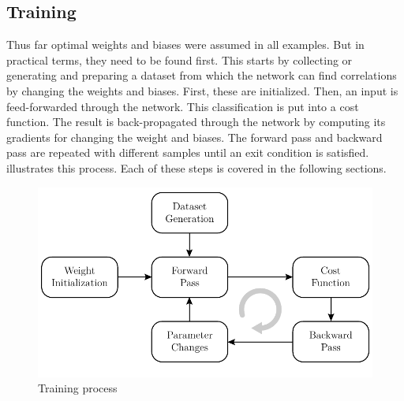 \subsection{Training}
\label{sec:neural-networks-training}
Thus far optimal weights and biases were assumed in all examples.
But in practical terms, they need to be found first.
This starts by collecting or generating and preparing a dataset from which the network can find correlations by changing the weights and biases.
First, these are initialized.
Then, an input is feed-forwarded through the network.
This classification is put into a cost function.
The result is back-propagated through the network by computing its gradients for changing the weight and biases.
The forward pass and backward pass are repeated with different samples until an exit condition is satisfied.
 illustrates this process.
Each of these steps is covered in the following sections.
\begin{figure}
	\centering
	\includegraphics{images/training.pdf}
	\caption[Training process]{Training process}
	\label{fig:training}
\end{figure}





